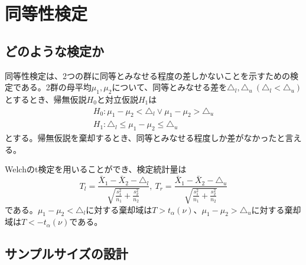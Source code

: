 \section{同等性検定}

\subsection{どのような検定か}

同等性検定は、2つの群に同等とみなせる程度の差しかないことを示すための検定である。2群の母平均$\mu_{1}, \mu_{2}$について、同等とみなせる差を$\triangle_{l}, \triangle_{u}\ (\triangle_{l} < \triangle_{u})$とするとき、帰無仮説$H_{0}$と対立仮説$H_{1}$は
\begin{gather}
    H_{0}: \mu_{1} - \mu_{2} < \triangle_{l} \lor \mu_{1} - \mu_{2} > \triangle_{u} \\
    H_{1}: \triangle_{l} \le \mu_{1} - \mu_{2} \le \triangle_{u}
\end{gather}
とする。帰無仮説を棄却するとき、同等とみなせる程度しか差がなかったと言える。

Welchのt検定を用いることができ、検定統計量は
\begin{equation}
    T_{l} = \frac{\bar{X}_{1} - \bar{X}_{2} - \triangle_{l}}{\sqrt{\frac{s_{1}^{2}}{n_{1}} + \frac{s_{2}^{2}}{n_{2}}}},\ T_{r} = \frac{\bar{X}_{1} - \bar{X}_{2} - \triangle_{u}}{\sqrt{\frac{s_{1}^{2}}{n_{1}} + \frac{s_{2}^{2}}{n_{2}}}}
\end{equation}
である。$\mu_{1} - \mu_{2} < \triangle_{l}$に対する棄却域は$T > t_{\alpha}(\nu)$、$\mu_{1} - \mu_{2} > \triangle_{u}$に対する棄却域は$T < -t_{\alpha}(\nu)$である。

\subsection{サンプルサイズの設計}

